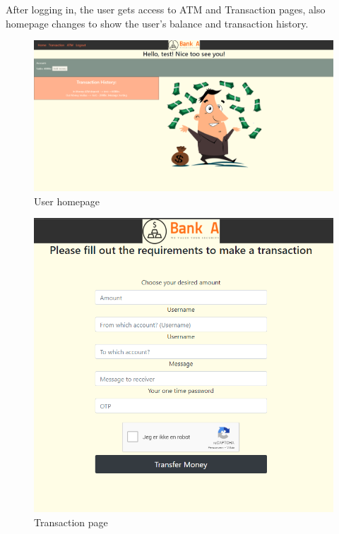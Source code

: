After logging in, the user gets access to ATM and Transaction pages, also homepage changes to show the user’s balance and transaction history.

\begin{figure}[H]
    \centering
    \includegraphics[width=\textwidth]{pics/pic3homeuser.PNG}
    \caption{User homepage}
    \label{fig:cha1fig3userhomepage}
\end{figure}

\begin{figure}[H]
    \centering
    \includegraphics[width=\textwidth]{pics/pic 3.1.PNG}
    \caption{Transaction page}
    \label{fig:cha1fig3.1transactionpage}
\end{figure}

